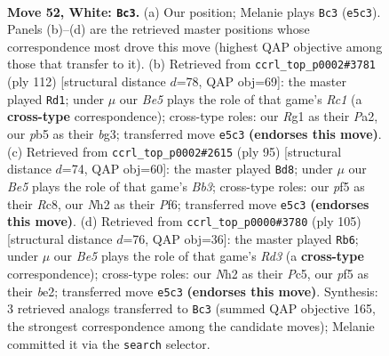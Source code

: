 \documentclass[11pt]{article}
\begin{document}
\clearpage

\begin{figure}[p]\centering
\begin{subfigure}{0.46\textwidth}\centering
\resizebox{\linewidth}{!}{%
\newchessgame
\chessboard[
  setfen={2r2b1r/3k2p1/p1p5/Pp1bBp1p/2p2P1P/4P1P1/1P5N/R1K3R1 w - - 5 52},
  showmover=false,
  pgfstyle=straightmove, color=movearrow, markmove={e5-c3}
]}
\caption{}
\end{subfigure}\hfill
\begin{subfigure}{0.46\textwidth}\centering
\resizebox{\linewidth}{!}{%
\newchessgame
\chessboard[
  setfen={rk1r4/1npb4/2p2p2/p5p1/N3B2p/1P2BPbP/P3R1P1/2R3K1 w - - 63 57},
  showmover=false,
  pgfstyle=straightmove, color=movearrow, markmove={c1-d1}
]}
\caption{}
\end{subfigure}
\\[4pt]
\begin{subfigure}{0.46\textwidth}\centering
\resizebox{\linewidth}{!}{%
\newchessgame
\chessboard[
  setfen={2r5/3k4/1bp1ppp1/p2r3p/2RP3P/1PR1BKP1/P4P2/8 b - - 23 48},
  showmover=false,
  pgfstyle=straightmove, color=movearrow, markmove={b6-d8}
]}
\caption{}
\end{subfigure}\hfill
\begin{subfigure}{0.46\textwidth}\centering
\resizebox{\linewidth}{!}{%
\newchessgame
\chessboard[
  setfen={2r5/4k1b1/3rp1p1/p1p2p1p/7P/1PPP1KP1/P1R1BP2/3R4 b - - 41 53},
  showmover=false,
  pgfstyle=straightmove, color=movearrow, markmove={d6-b6}
]}
\caption{}
\end{subfigure}
\caption{\textbf{Move 52, White: \texttt{Bc3}.} (a) Our position; Melanie plays \texttt{Bc3} (\texttt{e5c3}). Panels (b)--(d) are the retrieved master positions whose correspondence most drove this move (highest QAP objective among those that transfer to it). (b) Retrieved from \texttt{ccrl\_top\_p0002\#3781} (ply 112) [structural distance $d$=78, QAP obj=69]: the master played \texttt{Rd1}; under $\mu$ our \emph{Be5} plays the role of that game's \emph{Rc1} (a \textbf{cross-type} correspondence); cross-type roles: our \emph{R}g1 as their \emph{P}a2, our \emph{p}b5 as their \emph{b}g3; transferred move \texttt{e5c3} \textbf{(endorses this move)}. (c) Retrieved from \texttt{ccrl\_top\_p0002\#2615} (ply 95) [structural distance $d$=74, QAP obj=60]: the master played \texttt{Bd8}; under $\mu$ our \emph{Be5} plays the role of that game's \emph{Bb3}; cross-type roles: our \emph{p}f5 as their \emph{R}c8, our \emph{N}h2 as their \emph{P}f6; transferred move \texttt{e5c3} \textbf{(endorses this move)}. (d) Retrieved from \texttt{ccrl\_top\_p0000\#3780} (ply 105) [structural distance $d$=76, QAP obj=36]: the master played \texttt{Rb6}; under $\mu$ our \emph{Be5} plays the role of that game's \emph{Rd3} (a \textbf{cross-type} correspondence); cross-type roles: our \emph{N}h2 as their \emph{P}c5, our \emph{p}f5 as their \emph{b}e2; transferred move \texttt{e5c3} \textbf{(endorses this move)}. Synthesis: 3 retrieved analogs transferred to \texttt{Bc3} (summed QAP objective 165, the strongest correspondence among the candidate moves); Melanie committed it via the \texttt{search} selector.}
\label{fig:thought-m102}
\end{figure}
\end{document}
